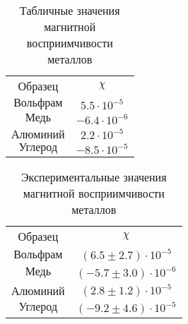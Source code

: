 \documentclass[a4paper]{article}
\begin{document}
        \begin{table}[h]
    \centering
        \begin{tabular}{|c|c|}
        \cline{1-2}
        Образец & $\chi$\\ \cline{1-2}
        $\text{Вольфрам}$&  $5.5 \cdot 10^{-5}$\\ \cline{1-2}
        $\text{Медь}$&  $-6.4\cdot 10^{-6}$\\ \cline{1-2}
        $\text{Алюминий}$& $2.2 \cdot 10^{-5}$\\ \cline{1-2}
        $\text{Углерод}$& $-8.5 \cdot 10^{-5}$ \\ \cline{1-2}
       
        \end{tabular}
        \caption{Табличные значения магнитной восприимчивости металлов}
        \label{tab:my_label}
    \end{table}

            \begin{table}[h]
    \centering
        \begin{tabular}{|c|c|}
        \cline{1-2}
        Образец & $\chi$\\ \cline{1-2}
        $\text{Вольфрам}$& $(6.5 \pm 2.7) \cdot 10^{-5}$  \\ \cline{1-2}
        $\text{Медь}$&  $(-5.7 \pm 3.0)\cdot 10^{-6}$\\ \cline{1-2}
        $\text{Алюминий}$& $(2.8 \pm 1.2)\cdot 10^{-5}$ \\ \cline{1-2}
        $\text{Углерод}$& $(-9.2  \pm 4.6)\cdot 10^{-5}$ \\ \cline{1-2}
       
        \end{tabular}
        \caption{Экспериментальные значения магнитной восприимчивости металлов}
        \label{tab:my_label}
    \end{table}
\end{document}
